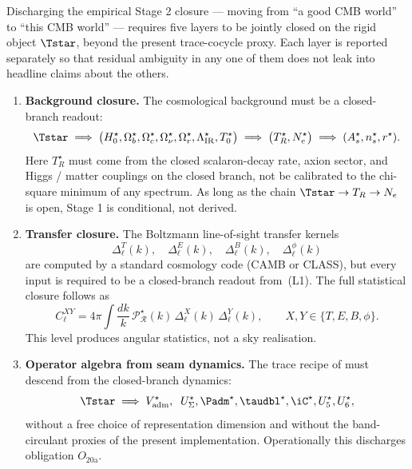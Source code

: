\begin{remark}
\label{rem:five-layer-roadmap}
Discharging the empirical Stage 2 closure --- moving from ``a good CMB world'' to ``this CMB
world'' --- requires five layers to be jointly closed on the rigid object $\Tstar$, beyond the
present trace-cocycle proxy. Each layer is reported separately so that residual ambiguity in any
one of them does not leak into headline claims about the others.

\begin{enumerate}[label=(L\arabic*),leftmargin=2.4em,topsep=3pt,itemsep=2pt]
\item \textbf{Background closure.} The cosmological background must be a closed-branch readout:
\[
\Tstar
\;\Longrightarrow\;
\bigl(H_0^\star,\Omega_b^\star,\Omega_c^\star,\Omega_\nu^\star,\Omega_r^\star,
\Lambda_{\mathrm{IR}}^\star,T_0^\star\bigr)
\;\Longrightarrow\;
\bigl(T_R^\star,N_e^\star\bigr)
\;\Longrightarrow\;
(A_s^\star,n_s^\star,r^\star).
\]
Here $T_R^\star$ must come from the closed scalaron-decay rate, axion sector, and Higgs / matter
couplings on the closed branch, not be calibrated to the chi-square minimum of any spectrum. As
long as the chain $\Tstar\to T_R\to N_e$ is open, Stage 1 is conditional, not derived.

\item \textbf{Transfer closure.} The Boltzmann line-of-sight transfer kernels
\[
\Delta_\ell^T(k),\quad
\Delta_\ell^E(k),\quad
\Delta_\ell^B(k),\quad
\Delta_\ell^{\phi}(k)
\]
are computed by a standard cosmology code (CAMB or CLASS), but every input is required to be a
closed-branch readout from~(L1). The full statistical closure follows as
\[
C_\ell^{XY}
=4\pi\int\frac{dk}{k}\,\mathcal P_{\mathcal R}^\star(k)\,
\Delta_\ell^X(k)\,\Delta_\ell^Y(k),
\qquad X,Y\in\{T,E,B,\phi\}.
\]
This level produces angular statistics, not a sky realisation.

\item \textbf{Operator algebra from seam dynamics.} The trace recipe of
 must descend from the closed-branch dynamics:
\[
\Tstar
\;\Longrightarrow\;
V_{\mathrm{adm}}^\star,\;\;
U_\Sigma^\star,\Padm^\star,\taudbl^\star,\iC^\star,U_5^\star,U_6^\star,
\]
without a free choice of representation dimension and without the band-circulant proxies of the
present implementation. Operationally this discharges obligation $O_{20\mathrm{a}}$.


\end{enumerate}
\end{remark}
